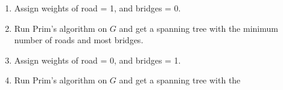 \documentclass[11pt]{article}
\begin{document}
 
 \begin{algo*}
 \begin{enumerate}
 \item Assign weights of road = 1, and bridges = 0.
 \item Run Prim's algorithm on $G$ and get a spanning tree with the minimum number of roads and most bridges.
 \item Assign weights of road = 0, and bridges = 1.
 \item Run Prim's algorithm on $G$ and get a spanning tree with the 
 \end{enumerate}
 \end{algo*}
\end{document}
